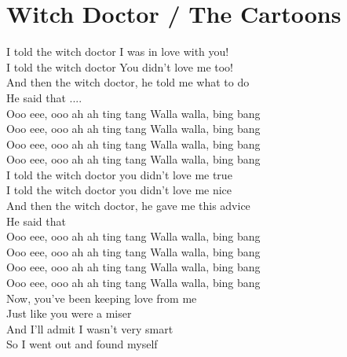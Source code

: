 \section{Witch Doctor / The Cartoons}\label{sec:witchdoctor}

\Amajor
\Cmajor
\DmajorEasy
\Gmajor

 I told the witch doctor I was in love with you!\\
 I told the witch doctor You didn't love me too!\\
 And then the witch doctor,  he told me what to do\\
 He said that ....\\
 Ooo eee,  ooo ah ah  ting tang  Walla walla, bing bang\\
 Ooo eee,  ooo ah ah ting  tang Walla walla, bing  bang\\
 Ooo eee,  ooo ah ah  ting tang  Walla walla, bing bang\\
 Ooo eee,  ooo ah ah ting  tang Walla walla, bing  bang\\
 I told the witch doctor you didn't love me true\\
 I told the witch doctor you didn't love me nice\\
 And then the witch doctor,  he gave me this advice\\
 He said that\\
 Ooo eee,  ooo ah ah  ting tang  Walla walla, bing bang\\
 Ooo eee,  ooo ah ah ting  tang Walla walla, bing  bang\\
 Ooo eee,  ooo ah ah  ting tang  Walla walla, bing bang\\
 Ooo eee,  ooo ah ah ting  tang Walla walla, bing  bang\\
 Now, you've been keeping love from me\\
Just  like you were a miser\\
And  I'll admit I wasn't very  smart\\
So  I went out and found myself\\

